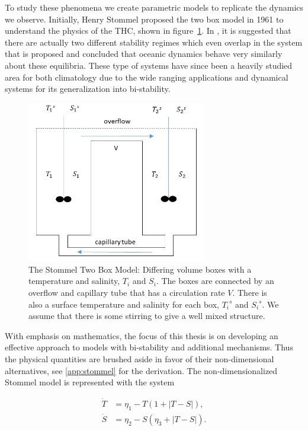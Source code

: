 \indent To study these phenomena we create parametric models to replicate the dynamics we observe. Initially, Henry Stommel proposed the two box model in 1961 to understand the physics of the THC, shown in figure~\ref{fig:stommel_boxes}. In \cite{stommel1961thermohaline}, it is suggested that there are actually two different stability regimes which even overlap in the system that is proposed and concluded that oceanic dynamics behave very similarly about these equilibria. These type of systems have since been a heavily studied area for both climatology due to the wide ranging applications and dynamical systems for its generalization into bi-stability.

\begin{figure}[H]
\centering
\includegraphics[width=0.7\textwidth]{intro/Box.jpg}
\caption{The Stommel Two Box Model: Differing volume boxes with a temperature and salinity, $T_i$ and $S_i$. The boxes are connected by an overflow and capillary tube that has a circulation rate $V$. There is also a surface temperature and salinity for each box, ${T_i}^s$ and ${S_i}^s$. We assume that there is some stirring to give a well mixed structure.}
\label{fig:stommel_boxes}
\end{figure}

\indent With emphasis on mathematics, the focus of this thesis is on developing an effective approach to models with bi-stability and additional mechanisms. Thus the physical quantities are brushed aside in favor of their non-dimensional alternatives, see \autoref{app:stommel} for the derivation. The non-dimensionalized Stommel model is represented with the system

\begin{equation}
 \begin{aligned}
  \dot{T} & = \eta_1-T(1+|T-S|), \\
  \dot{S}   & = \eta_2-S(\eta_3+|T-S|). 
 \end{aligned}
\end{equation}

